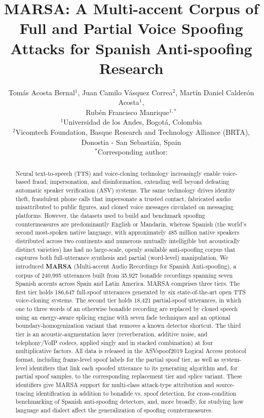 \documentclass[11pt]{article}
\title{\textbf{MARSA: A Multi-accent Corpus of Full and
Partial Voice Spoofing Attacks for Spanish Anti-spoofing Research}}
\author{%
Tom\'as Acosta Bernal$^{1}$, Juan Camilo V\'asquez Correa$^{2}$,
Mart\'in Daniel Calder\'on Acosta$^{1}$,\\
Rub\'en Francisco Manrique$^{1,\ast}$ \\[4pt]
\small $^{1}$Universidad de los Andes, Bogot\'a, Colombia \\
\small $^{2}$Vicomtech Foundation, Basque Research and Technology Alliance (BRTA), Donostia - San Sebastián, Spain \\
\small $^{\ast}$Corresponding author: \PENDING{email}
}
\date{}
\begin{document}
\maketitle

\begin{abstract}
\noindent
Neural text-to-speech (TTS) and voice-cloning technology increasingly
enable voice-based fraud, impersonation, and disinformation, extending
well beyond defeating automatic speaker verification (ASV) systems. The
same technology drives identity theft, fraudulent phone calls that
impersonate a trusted contact, fabricated audio misattributed to public
figures, and cloned voice messages circulated on messaging platforms. However, the datasets used to build and benchmark spoofing countermeasures
are predominantly English or Mandarin, whereas Spanish (the world's second
most-spoken native language, with approximately 485 million native
speakers \citep{ethnologue2025} distributed across two continents and
numerous mutually intelligible but acoustically distinct varieties) has
had no large-scale, openly available anti-spoofing corpus that captures
both full-utterance synthesis and partial (word-level) manipulation. We introduced \textbf{MARSA} (Multi-accent Audio Recordings for Spanish
Anti-spoofing), a corpus of 240{,}995 utterances built
from 35{,}927 bonafide recordings spanning seven Spanish accents across
Spain and Latin America. MARSA comprises three tiers. The first tier holds 186{,}647 full-spoof
utterances generated by six state-of-the-art open TTS voice-cloning
systems. The second tier holds 18{,}421 partial-spoof utterances, in
which one to three words of an otherwise bonafide recording are replaced
by cloned speech using an energy-aware splicing engine with seven fade
techniques and an optional boundary-homogenization variant that removes
a known detector shortcut. The third tier is an
acoustic-augmentation layer (reverberation, additive noise, and telephony/VoIP codecs, applied
singly and in stacked combination) at four multiplicative factors. All data is released in the ASVspoof2019 Logical Access protocol format, including frame-level spoof labels for the partial spoof tier, as well as system-level identifiers that link each spoofed utterance to its generating algorithm and, for partial spoof samples, to the corresponding replacement tier and splice variant. These identifiers give MARSA
support for multi-class attack-type attribution and source-tracing
identification in addition to bonafide vs. spoof detection, for
cross-condition benchmarking of Spanish anti-spoofing detectors, and,
more broadly, for studying how language and dialect affect the
generalization of spoofing countermeasures.
\end{abstract}
\end{document}

